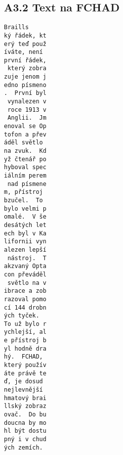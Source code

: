 \subsection*{A3.2 Text na FCHAD}
\begin{multicols}{3}
\begin{verbatim}
Braills
ký řádek, kt
erý teď použ
íváte, není 
první řádek,
 který zobra
zuje jenom j
edno písmeno
.  První byl
 vynalezen v
 roce 1913 v
 Anglii.  Jm
enoval se Op
tofon a přev
áděl světlo 
na zvuk.  Kd
yž čtenář po
hyboval spec
iálním perem
 nad písmene
m, přístroj 
bzučel.  To 
bylo velmi p
omalé.  V še
desátých let
ech byl v Ka
lifornii vyn
alezen lepší
 nástroj.  T
akzvaný Opta
con převáděl
 světlo na v
ibrace a zob
razoval pomo
cí 144 drobn
ých tyček.  
To už bylo r
ychlejší, al
e přístroj b
yl hodně dra
hý.  FCHAD, 
který použív
áte právě te
ď, je dosud 
nejlevnější 
hmatový brai
llský zobraz
ovač.  Do bu
doucna by mo
hl být dostu
pný i v chud
ých zemích.
\end{verbatim}
\end{multicols}

